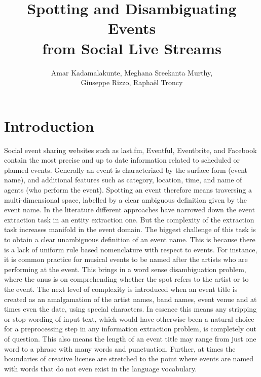 \documentclass[10pt,a4paper]{article}
\author{Amar Kadamalakunte, Meghana Sreekanta Murthy,\\Giuseppe Rizzo, Rapha\"el Troncy}
\title{Spotting and Disambiguating Events\\from Social Live Streams}
\begin{document}
\maketitle
\section{Introduction}
\label{sec:introduction}
Social event sharing websites such as last.fm, Eventful, Eventbrite, and Facebook contain the most precise and up to date information related to scheduled or planned events. 
Generally an event is characterized by the surface form (event name), and additional features such as category, location, time, and name of agents (who perform the event). Spotting an event therefore means traversing a multi-dimensional space, labelled by a clear ambiguous definition given by the event name. 
In the literature different approaches have narrowed down the event extraction task in an entity extraction one. But the complexity of the extraction task increases manifold in the event domain. The biggest challenge of this task is to obtain a clear unambiguous definition of an event name. This is because there is a lack of uniform rule based nomenclature with respect to events. 
For instance, it is common practice for musical events to be named after the artists who are performing at the event. 
This brings in a word sense disambiguation problem, where the onus is on comprehending whether the spot refers to the artist or to the event. The next level of complexity is introduced when an event title is created as an amalgamation of the artist names, band names, event venue and at times even the date, using special characters. %
In essence this means any stripping or stop-wording of input text, which would have otherwise been a natural choice for a preprocessing step in any information extraction problem, is completely out of question. This also means the length of an event title may range from just one word to a phrase with many words and punctuation. Further, at times the boundaries of creative license are stretched to the point where events are named with words that do not even exist in the language vocabulary. 
\end{document}
